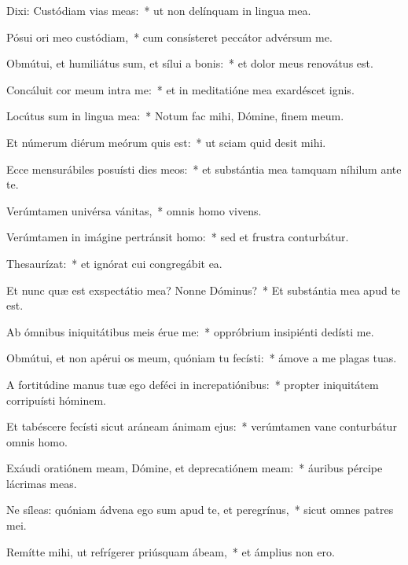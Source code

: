 \item Dixi: Custódiam vias meas:~* ut non delínquam in lingua mea.

\item Pósui ori meo custódiam,~* cum consísteret peccátor advérsum me.

\item Obmútui, et humiliátus sum, et sílui a bonis:~* et dolor meus renovátus est.

\item Concáluit cor meum intra me:~* et in meditatióne mea exardéscet ignis.

\item Locútus sum in lingua mea:~* Notum fac mihi, Dómine, finem meum.

\item Et númerum diérum meórum quis est:~* ut sciam quid desit mihi.

\item Ecce mensurábiles posuísti dies meos:~* et substántia mea tamquam níhilum ante te.

\item Verúmtamen univérsa vánitas,~* omnis homo vivens.

\item Verúmtamen in imágine pertránsit homo:~* sed et frustra conturbátur.

\item Thesaurízat:~* et ignórat cui congregábit ea.

\item Et nunc quæ est exspectátio mea? Nonne Dóminus?~* Et substántia mea apud te est.

\item Ab ómnibus iniquitátibus meis érue me:~* oppróbrium insipiénti dedísti me.

\item Obmútui, et non apérui os meum, quóniam tu fecísti:~* ámove a me plagas tuas.

\item A fortitúdine manus tuæ ego deféci in increpatiónibus:~* propter iniquitátem corripuísti hóminem.

\item Et tabéscere fecísti sicut aráneam ánimam ejus:~* verúmtamen vane conturbátur omnis homo.

\item Exáudi oratiónem meam, Dómine, et deprecatiónem meam:~* áuribus pércipe lácrimas meas.

\item Ne síleas: quóniam ádvena ego sum apud te, et peregrínus,~* sicut omnes patres mei.

\item Remítte mihi, ut refrígerer priúsquam ábeam,~* et ámplius non ero.